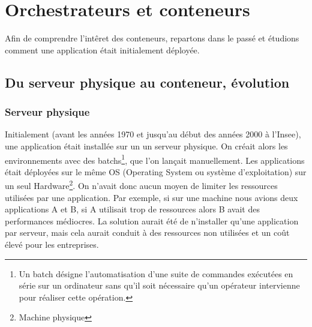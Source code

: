\documentclass[11pt,fleqn]{book} %
\begin{document}
\chapter{Orchestrateurs et conteneurs}
\vspace{-2cm}

Afin de comprendre l'intêret des conteneurs, repartons dans le passé et étudions comment une application était initialement déployée.

\section{Du serveur physique au conteneur, évolution}
\subsection{Serveur physique}
Initialement (avant les années 1970 et jusqu'au début des années 2000 à l'Insee), une application était installée sur un un serveur physique. On créait alors les environnements avec des batchs\footnote{Un batch désigne l'automatisation d'une suite de commandes exécutées en série sur un ordinateur sans qu'il soit nécessaire qu'un opérateur intervienne pour réaliser cette opération.}, que l'on lançait manuellement. Les applications était déployées sur le même OS (Operating System ou système d'exploitation) sur un seul Hardware\footnote{Machine physique}. On n'avait donc aucun moyen de limiter les ressources utilisées par une application. Par exemple, si sur une machine nous avions deux applications A et B, si A utilisait trop de ressources alors B avait des performances médiocres. La solution aurait été de n'installer qu'une application par serveur, mais cela aurait conduit à des ressources non utilisées et un coût élevé pour les entreprises. \newline
\end{document}
